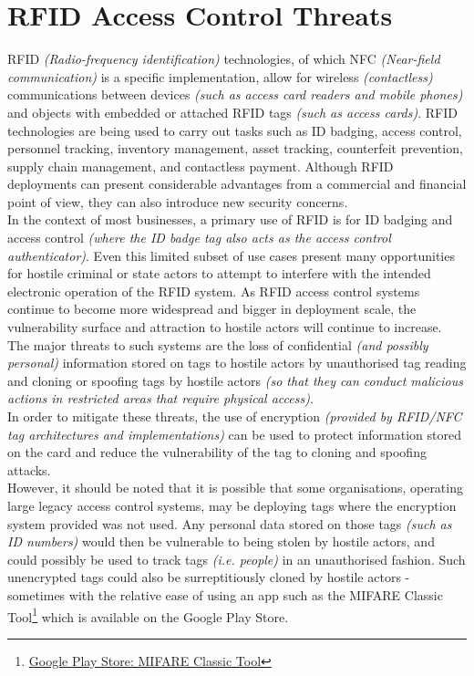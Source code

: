 \section{RFID Access Control Threats}
RFID \textit{(Radio-frequency identification)} technologies, of which NFC \textit{(Near-field communication)} is a specific implementation, allow for wireless \textit{(contactless)} communications between devices \textit{(such as access card readers and mobile phones)} and objects with embedded or attached RFID tags \textit{(such as access cards)}. RFID technologies are being used to carry out tasks such as ID badging, access control, personnel tracking, inventory management, asset tracking, counterfeit prevention, supply chain management, and contactless payment. Although RFID deployments can present considerable advantages from a commercial and financial point of view, they can also introduce new security concerns.\\

\noindent In the context of most businesses, a primary use of RFID is for ID badging and access control \textit{(where the ID badge tag also acts as the access control authenticator)}. Even this limited subset of use cases present many opportunities for hostile criminal or state actors to attempt to interfere with the intended electronic operation of the RFID system. As RFID access control systems continue to become more widespread and bigger in deployment scale, the vulnerability surface and attraction to hostile actors will continue to increase.\\

\noindent The major threats to such systems are the loss of confidential \textit{(and possibly personal)} information stored on tags to hostile actors by unauthorised tag reading and cloning or spoofing tags by hostile actors \textit{(so that they can conduct malicious actions in restricted areas that require physical access)}.\\

\noindent In order to mitigate these threats, the use of encryption \textit{(provided by RFID/NFC tag architectures and implementations)} can be used to protect information stored on the card and reduce the vulnerability of the tag to cloning and spoofing attacks.\\

\noindent However, it should be noted that it is possible that some organisations, operating large legacy access control systems, may be deploying tags where the encryption system provided was not used. Any personal data stored on those tags \textit{(such as ID numbers)} would then be vulnerable to being stolen by hostile actors, and could possibly be used to track tags \textit{(i.e. people)} in an unauthorised fashion. Such unencrypted tags could also be surreptitiously cloned by hostile actors - sometimes with the relative ease of using an app such as the MIFARE Classic Tool\footnote{\href{https://play.google.com/store/apps/details?id=de.syss.MifareClassicTool&hl=en_GB&rdid=de.syss.MifareClassicTool}{Google Play Store: MIFARE Classic Tool}} which is available on the Google Play Store.\\

